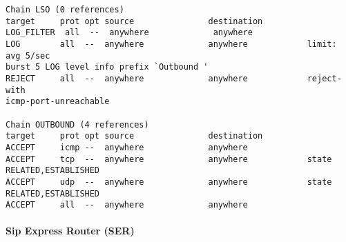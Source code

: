\documentclass[a4paper,12pt]{report}
\newenvironment{myscriptlisting}
{\begin{list}{}{\setlength{\leftmargin}{1em}}\item\scriptsize\bfseries}
{\end{list}}
\begin{document}
\begin{myscriptlisting}
\begin{verbatim}
Chain LSO (0 references)
target     prot opt source               destination         
LOG_FILTER  all  --  anywhere             anywhere            
LOG        all  --  anywhere             anywhere            limit: avg 5/sec
burst 5 LOG level info prefix `Outbound ' 
REJECT     all  --  anywhere             anywhere            reject-with
icmp-port-unreachable 

Chain OUTBOUND (4 references)
target     prot opt source               destination         
ACCEPT     icmp --  anywhere             anywhere            
ACCEPT     tcp  --  anywhere             anywhere            state
RELATED,ESTABLISHED 
ACCEPT     udp  --  anywhere             anywhere            state
RELATED,ESTABLISHED 
ACCEPT     all  --  anywhere             anywhere   
\end{verbatim}
\end{myscriptlisting}

\newpage

\paragraph{Sip Express Router (SER)}
\end{document}
